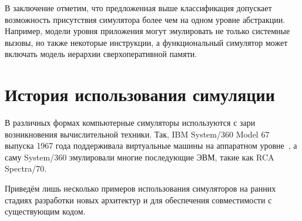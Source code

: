 В заключение отметим, что предложенная выше классификация допускает возможность присутствия симулятора более чем на одном уровне абстракции. Например, модели уровня приложения могут эмулировать не только системные вызовы, но также некоторые инструкции, а функциональный симулятор может включать модель иерархии сверхоперативной памяти.

\section{История использования симуляции}

В различных формах компьютерные симуляторы используются с зари возникновения вычислительной техники. Так, IBM System/360 Model 67 выпуска 1967 года поддерживала виртуальные машины на аппаратном уровне~\cite{ibm360vm}, а саму System/360 эмулировали многие последующие ЭВМ, такие как RCA Spectra/70.

Приведём лишь несколько примеров использования симуляторов на ранних стадиях разработки новых архитектур и для обеспечения совместимости с существующим кодом.

